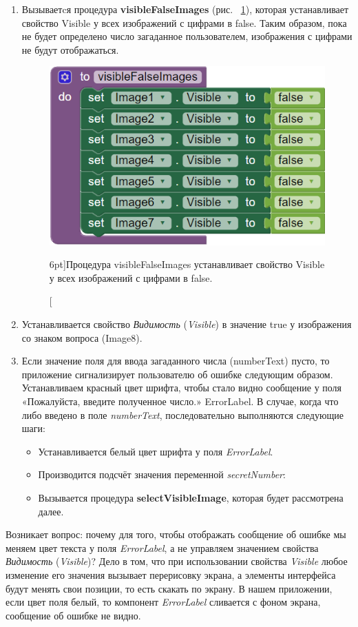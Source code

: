 \begin{enumerate}
  \item Вызываетcя процедура \textbf{visibleFalseImages} (рис. ~\ref{fig:block:visible:false:images}), которая устанавливает свойство Visible у всех изображений с цифрами в false. Таким образом, пока не будет определено число загаданное пользователем, изображения с цифрами не будут отображаться.
  \begin{figure}
    \includegraphics{./graphics/programs/guess_numbers/procedure_visibleFalseImages_AppInventor_2018.png}
      \caption[Процедура visibleFalseImages.][6pt]{Процедура visibleFalseImages устанавливает свойство Visible у всех изображений с цифрами в false.}
    \label{fig:block:visible:false:images}
  \end{figure}

  \item Устанавливается свойство \textit{Видимость} (\textit{Visible}) в значение true у изображения со знаком вопроса (Image8).
  \item Если значение поля для ввода загаданного числа (numberText) пусто, то приложение сигнализирует пользователю об ошибке следующим образом. Устанавливаем красный цвет шрифта, чтобы стало видно сообщение у поля  «Пожалуйста, введите полученное число.» ErrorLabel. В случае, когда что либо введено в поле \textit{numberText}, последовательно выполняются следующие шаги:
  \begin{itemize}
    \item Устанавливается белый цвет шрифта у поля \textit{ErrorLabel}.
    \item Производится подсчёт значения переменной \textit{secretNumber}:
    \item Вызывается процедура \textbf{selectVisibleImage}, которая будет рассмотрена далее.
  \end{itemize}
\end{enumerate}
Возникает вопрос: почему для того, чтобы отображать сообщение об ошибке мы меняем цвет текста у поля \textit{ErrorLabel}, а не управляем значением свойства \textit{Видимость} (\textit{Visible})? Дело в том, что при использовании свойства \textit{Visible} любое изменение его значения вызывает перерисовку экрана, а элементы интерфейса будут менять свои позиции, то есть скакать по экрану. В нашем приложении, если цвет поля белый, то компонент \textit{ErrorLabel} сливается с фоном экрана, сообщение об ошибке не видно.
